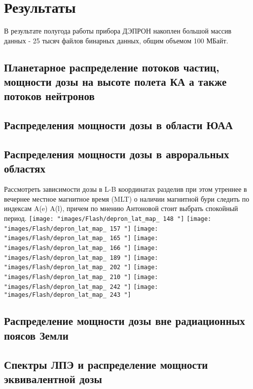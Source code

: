 
\chapter{Результаты}\label{chapt_results}
В результате полугода работы прибора ДЭПРОН накоплен большой массив данных - 25 тысяч файлов бинарных данных, общим объемом 100 МБайт.


\section{Планетарное распределение потоков частиц, мощности дозы на высоте полета КА а также потоков нейтронов}


\section{Распределения мощности дозы в области ЮАА}

\section{Распределения мощности дозы в авроральных областях}

Рассмотреть зависимости дозы в L-B координатах разделив при этом утреннее в вечернее местное магнитное время (MLT) о наличии магнитной бури следить по индексам A(e) A(l), причем по мнению Антоновой стоит выбрать спокойный период.
\texttt{[image: "images/Flash/depron\_lat\_map\_ 148 "]}
\texttt{[image: "images/Flash/depron\_lat\_map\_ 157 "]}
\texttt{[image: "images/Flash/depron\_lat\_map\_ 165 "]}
\texttt{[image: "images/Flash/depron\_lat\_map\_ 166 "]}
\texttt{[image: "images/Flash/depron\_lat\_map\_ 189 "]}
\texttt{[image: "images/Flash/depron\_lat\_map\_ 202 "]}
\texttt{[image: "images/Flash/depron\_lat\_map\_ 210 "]}
\texttt{[image: "images/Flash/depron\_lat\_map\_ 242 "]}
\texttt{[image: "images/Flash/depron\_lat\_map\_ 243 "]}

\section{Распределение мощности дозы вне радиационных поясов Земли}

\section{Спектры ЛПЭ и распределение мощности эквивалентной дозы}